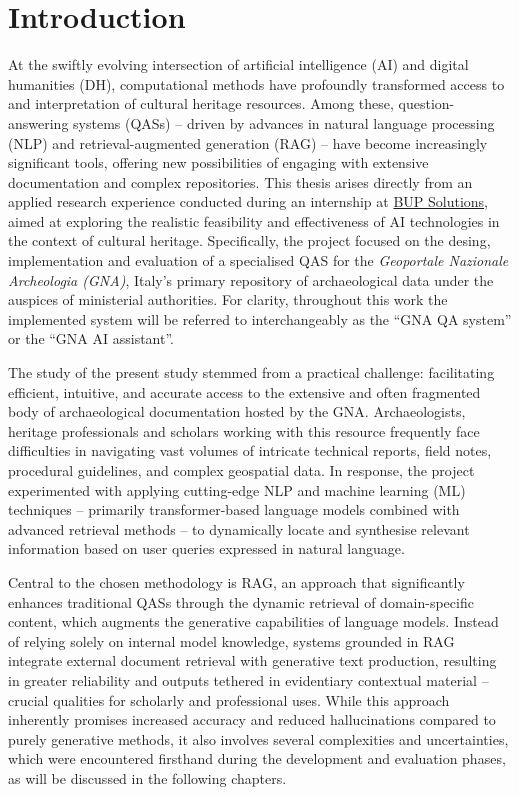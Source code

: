 \chapter{Introduction}
\label{chap:introduction}
\begin{spacing}{1.5}  %
At the swiftly evolving intersection of artificial intelligence (AI) and digital humanities (DH), computational methods have profoundly transformed access to and interpretation of cultural heritage resources. Among these, question-answering systems (QASs) -- driven by advances in natural language processing (NLP) and retrieval-augmented generation (RAG) -- have become increasingly significant tools, offering new possibilities of engaging with extensive documentation and complex repositories. This thesis arises directly from an applied research experience conducted during an internship at \href{https://www.bupsolutions.com/en/home_en/}{BUP Solutions}\nocite{bup_solutions_bup_nodate}, aimed at exploring the realistic feasibility and effectiveness of AI technologies in the context of cultural heritage. Specifically, the project focused on the desing, implementation and evaluation of a specialised QAS for the \textit{Geoportale Nazionale Archeologia (GNA)}, Italy’s primary repository of archaeological data under the auspices of ministerial authorities. For clarity, throughout this work the implemented system will be referred to interchangeably as the ``GNA QA system'' or the ``GNA AI assistant''.

The study of the present study stemmed from a practical challenge: facilitating efficient, intuitive, and accurate access to the extensive and often fragmented body of archaeological documentation hosted by the GNA. Archaeologists, heritage professionals and scholars working with this resource frequently face difficulties in navigating vast volumes of intricate technical reports, field notes, procedural guidelines, and complex geospatial data. In response, the project experimented with applying cutting-edge NLP and machine learning (ML) techniques -- primarily transformer-based language models combined with advanced retrieval methods -- to dynamically locate and synthesise relevant information based on user queries expressed in natural language.

Central to the chosen methodology is RAG, an approach that significantly enhances traditional QASs through the dynamic retrieval of domain-specific content, which augments the generative capabilities of language models. Instead of relying solely on internal model knowledge, systems grounded in RAG integrate external document retrieval with generative text production, resulting in greater reliability and outputs tethered in evidentiary contextual material -- crucial qualities for scholarly and professional uses. While this approach inherently promises increased accuracy and reduced hallucinations compared to purely generative methods, it also involves several complexities and uncertainties, which were encountered firsthand during the development and evaluation phases, as will be discussed in the following chapters.


\end{spacing}
